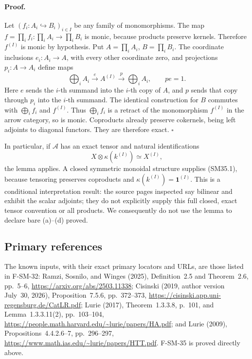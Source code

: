 \documentclass[11pt,a4paper]{article}
\theoremstyle{definition}\newtheorem{definition}[theorem]{Definition}
\theoremstyle{remark}\newtheorem{remark}[theorem]{Remark}
\begin{document}
\paragraph{Proof.}
Let \((f_i:A_i\hookrightarrow B_i)_{i\in I}\) be any
family of monomorphisms.  The map
\(f=\prod_i f_i:\prod_iA_i\to\prod_iB_i\) is monic,
because products preserve kernels.  Therefore
\(f^{(I)}\) is monic by hypothesis.  Put
\(A=\prod_iA_i\), \(B=\prod_iB_i\).  The coordinate
inclusions \(e_i:A_i\to A\), with every other coordinate
zero, and projections \(p_i:A\to A_i\) define maps
\[
 \bigoplus_iA_i\xrightarrow{e}A^{(I)}
                   \xrightarrow{p}\bigoplus_iA_i,
 \qquad pe=1.
\]
Here \(e\) sends the \(i\)-th summand into the \(i\)-th
copy of \(A\), and \(p\) sends that copy through \(p_i\)
into the \(i\)-th summand.  The identical construction for
\(B\) commutes with \(\bigoplus_i f_i\) and \(f^{(I)}\).
Thus \(\bigoplus_i f_i\) is a retract of the monomorphism
\(f^{(I)}\) in the arrow category, so is monic.
Coproducts already preserve cokernels, being left adjoints
to diagonal functors.  They are therefore exact. \(\square\)

In particular, if \(\mathcal A\) has an exact tensor and
natural identifications
\[
              X\otimes\kappa(k^{(I)})\simeq X^{(I)},
                                                               \tag{SM35.1}
\]
the lemma applies.  A closed symmetric monoidal structure
supplies (SM35.1), because tensoring preserves coproducts
and \(\kappa(k^{(I)})=\mathbf1^{(I)}\).
This is a conditional interpretation result: the source
pages inspected say bilinear and exhibit the scalar
adjoints; they do not explicitly supply this full closed,
exact tensor convention or all products.  We consequently
do not use the lemma to declare bare (a)--(d) proved.

\subsection{Primary references}
The known inputs, with their exact primary locators and URLs,
are those listed in F-SM-32: Ramzi, Sosnilo, and Winges
(2025), Definition~2.5 and Theorem~2.6, pp.~5--6,
\url{https://arxiv.org/abs/2503.11338};
Cisinski (2019, author version July~30, 2026),
Proposition~7.5.6, pp.~372--373,
\url{https://cisinski.app.uni-regensburg.de/CatLR.pdf};
Lurie (2017), Theorem~1.3.3.8, p.~101, and
Lemma~1.3.3.11(2), pp.~103--104,
\url{https://people.math.harvard.edu/~lurie/papers/HA.pdf};
and Lurie (2009), Propositions~4.4.2.6--7, pp.~296--297,
\url{https://www.math.ias.edu/~lurie/papers/HTT.pdf}.
F-SM-35 is proved directly above.
\end{document}
